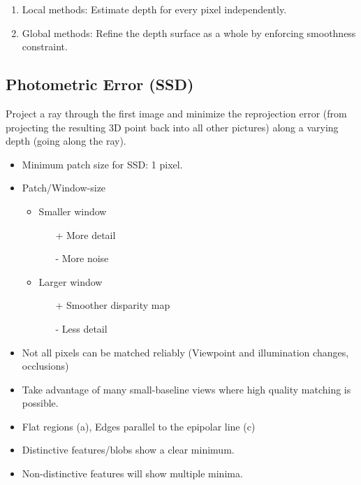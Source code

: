 \documentclass[10pt,a4paper]{scrartcl}
\begin{document}
\begin{multicols*}{2}
\begin{enumerate}
\item Local methods: Estimate depth for every pixel independently.
\item Global methods: Refine the depth surface as a whole by enforcing smoothness constraint.
\end{enumerate}

\subsection{Photometric Error (SSD)}

Project a ray through the first image and minimize the reprojection error (from projecting the resulting 3D point back into all other pictures) along a varying depth (\glqq going along the ray\grqq).

\begin{itemize}
\item Minimum patch size for SSD: 1 pixel.
\item Patch/Window-size
\begin{itemize}
\item Smaller window
\begin{itemize}
\item[+] More detail
\item[-] More noise
\end{itemize}
\item Larger window
\begin{itemize}
\item[+] Smoother disparity map
\item[-] Less detail
\end{itemize}
\end{itemize}
\item Not all pixels can be matched reliably (Viewpoint and illumination changes, occlusions)
\item Take advantage of many small-baseline views where high quality matching is possible.
\end{itemize}


\begin{itemize}
\item Flat regions (a), Edges parallel to the epipolar line (c)
\item Distinctive features/blobs show a clear minimum.
\item Non-distinctive features will show multiple minima.
\end{itemize}


\end{multicols*}
\end{document}
